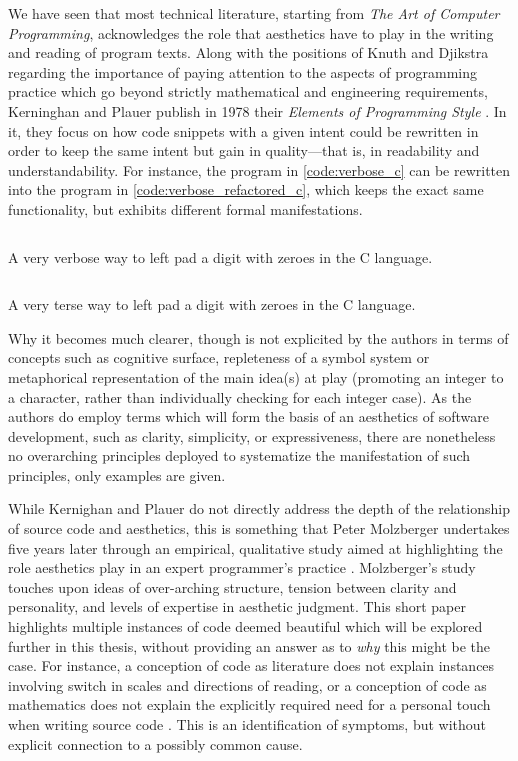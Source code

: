 We have seen that most technical literature, starting from \emph{The Art of Computer Programming}, acknowledges the role that aesthetics have to play in the writing and reading of program texts. Along with the positions of Knuth and Djikstra regarding the importance of paying attention to the aspects of programming practice \citep{dijkstra_chapter_1972} which go beyond strictly mathematical and engineering requirements, Kerninghan and Plauer publish in 1978 their \emph{Elements of Programming Style} \citep{kernighan_elements_1978}. In it, they focus on how code snippets with a given intent could be rewritten in order to keep the same intent but gain in quality—that is, in readability and understandability. For instance, the program in \ref{code:verbose_c} can be rewritten into the program in \ref{code:verbose_refactored_c}, which keeps the exact same functionality, but exhibits different formal manifestations.

\begin{listing}
    \inputminted{c}{./corpus/verbose.c}
    \caption{A very verbose way to left pad a digit with zeroes in the C language.}
    \label{code:verbose_c}
\end{listing}

\begin{listing}
    \inputminted{c}{./corpus/verbose_refactored.c}
    \caption{A very terse way to left pad a digit with zeroes in the C language.}
    \label{code:verbose_refactored_c}
\end{listing}

Why it becomes much clearer, though is not explicited by the authors in terms of concepts such as cognitive surface, repleteness of a symbol system or metaphorical representation of the main idea(s) at play (promoting an integer to a character, rather than individually checking for each integer case). As the authors do employ terms which will form the basis of an aesthetics of software development, such as clarity, simplicity, or expressiveness, there are nonetheless no overarching principles deployed to systematize the manifestation of such principles, only examples are given.

While Kernighan and Plauer do not directly address the depth of the relationship of source code and aesthetics, this is something that Peter Molzberger undertakes five years later through an empirical, qualitative study aimed at highlighting the role aesthetics play in an expert programmer's practice \citep{molzberger_aesthetics_1983}. Molzberger's study touches upon ideas of over-arching structure, tension between clarity and personality, and levels of expertise in aesthetic judgment. This short paper highlights multiple instances of code deemed beautiful which will be explored further in this thesis, without providing an answer as to \emph{why} this might be the case. For instance, a conception of code as literature does not explain instances involving switch in scales and directions of reading, or a conception of code as mathematics does not explain the explicitly required need for a personal touch when writing source code \citep{molzberger_aesthetics_1983}. This is an identification of symptoms, but without explicit connection to a possibly common cause.

